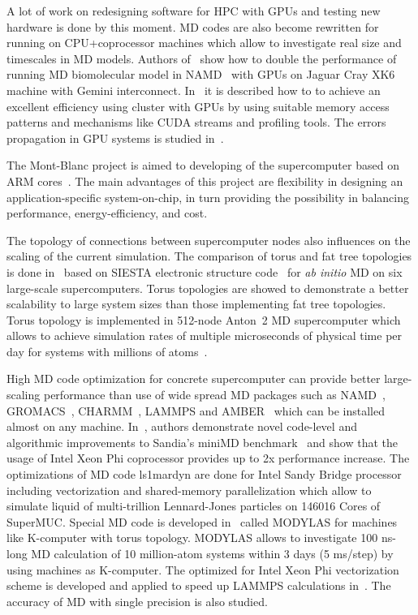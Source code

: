 \documentclass{llncs}
\begin{document}
A lot of work on redesigning software for HPC with GPUs and testing new hardware is done by this moment. MD codes are also become rewritten for running on CPU+coprocessor machines which allow to investigate real size and timescales in MD models. Authors of~\cite{Sun2012} show how to double the performance of running MD biomolecular model in NAMD~\cite{NAMD} with GPUs on Jaguar Cray XK6 machine with Gemini interconnect. In~\cite{Bernaschi2015} it is described how to to achieve an excellent efficiency using cluster with GPUs by using suitable memory access patterns and mechanisms like CUDA streams and profiling tools. The errors propagation in GPU systems is studied in~\cite{Li2016}.

The Mont-Blanc project is aimed to developing of the supercomputer based on ARM cores~\cite{Rajovic2016}. The main advantages of this project are flexibility in designing an application-specific system-on-chip, in turn providing the possibility in balancing performance, energy-efficiency, and cost.

The topology of connections between supercomputer nodes also influences on the scaling of the current simulation. The comparison of torus and fat tree topologies is done in~\cite{Corsetti2014} based on SIESTA electronic structure code~\cite{SIESTA} for \textit{ab initio} MD on six large-scale supercomputers. Torus topologies are showed to demonstrate a better scalability to large system sizes than those implementing fat tree topologies. Torus topology is implemented in 512-node Anton~2 MD supercomputer which allows to achieve simulation rates of multiple microseconds of physical time per day for systems with millions of atoms~\cite{Shaw2014}.

High MD code optimization for concrete supercomputer can provide better large-scaling performance than use of wide spread MD packages such as NAMD~\cite{NAMD}, GROMACS~\cite{GROMACS}, CHARMM~\cite{CHARMM}, LAMMPS and AMBER~\cite{AMBER} which can be installed almost on any machine.  In~\cite{Pennycook2013}, authors demonstrate novel code-level and algorithmic improvements to Sandia's miniMD benchmark~\cite{SandiaMD} and show that the usage of Intel Xeon Phi coprocessor provides up to 2x performance increase. The optimizations of MD code ls1mardyn are done for Intel Sandy Bridge processor including vectorization and shared-memory parallelization which allow to simulate liquid of multi-trillion Lennard-Jones particles on 146016 Cores of SuperMUC. Special MD code is developed in~\cite{Yoshii2015} called MODYLAS for machines like K-computer with torus topology. MODYLAS allows to investigate 100 ns-long MD calculation of 10 million-atom systems within 3 days (5 ms/step) by using machines as K-computer. The optimized for Intel Xeon Phi vectorization scheme is developed and applied to speed up LAMMPS calculations in~\cite{Hohnerbach2016}. The accuracy of MD with single precision is also studied.
\end{document}
